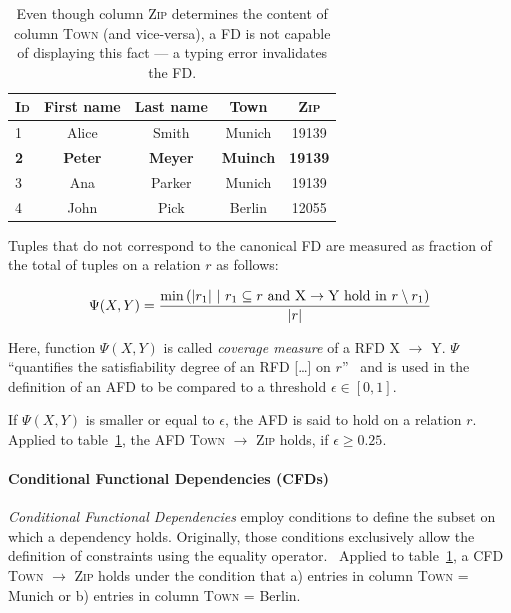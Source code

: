 \begin{table}[ht]
    \centering
    \begin{tabular}{lcccc}
        \toprule
        \textsc{Id} & First name & Last name & Town & \textsc{Zip} \\
        \midrule
        1 & Alice & Smith & Munich & 19139 \\
        \textbf{2} & \textbf{Peter}& \textbf{Meyer} &
        \textbf{Muinch} & \textbf{19139} \\
        3 & Ana & Parker & Munich & 19139  \\
        4 & John & Pick & Berlin & 12055 \\
        \bottomrule
    \end{tabular}
    \caption{Even though column \textsc{Zip} determines the content of column \textsc{Town} (and vice-versa), a FD is not capable of displaying this fact --- a typing error invalidates the FD.}
    \label{tab:example-afd-necessity}
\end{table}

Tuples that do not correspond to the canonical FD are measured as fraction of the total of tuples on a relation \( r \) as follows:

\begin{align}
    \Psi(X, Y) = \frac{\min{\left(|r_1|~|~r_1 \subseteq r \text{ and } \textsc{X} \rightarrow \textsc{Y} \text{ hold in } r \setminus r_1 \right)}}{|r|}
\end{align}

Here, function \( \Psi(X, Y) \) is called \emph{coverage measure} of a RFD \textsc{X} \( \to \) \textsc{Y}.
\( \Psi \) ``quantifies the satisfiability degree of an RFD [\dots] on \( r \)''~\cite[p.~150]{CAR16} and is used in the definition of an AFD to be compared to a threshold \( \epsilon \in [0, 1] \).

If \( \Psi(X, Y) \) is smaller or equal to \( \epsilon \), the AFD is said to hold on a relation \( r \).
Applied to table~\ref{tab:example-afd-necessity}, the AFD \textsc{Town} \( \to \) \textsc{Zip} holds, if \( \epsilon \geq 0.25\).

\paragraph{Conditional Functional Dependencies (CFDs)}
\emph{Conditional Functional Dependencies} employ conditions to define the subset on which a dependency holds.
Originally, those conditions exclusively allow the definition of constraints using the equality operator.~\cite[p.~152]{CAR16}
Applied to table~\ref{tab:example-afd-necessity}, a CFD \textsc{Town} \( \to\) \textsc{Zip} holds under the condition that a) entries in column \textsc{Town} = Munich or b) entries in column \textsc{Town} = Berlin.

